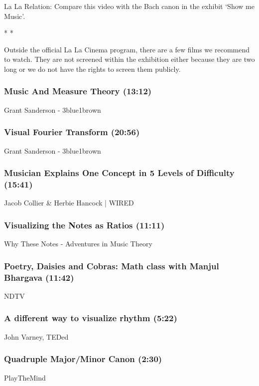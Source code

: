 La La Relation: Compare this video with the Bach canon in the exhibit `Show me Music'.

\begin{center} \large * * * \end{center}
\vspace{1em}

Outside the official La La Cinema program, there are a few films we recommend to watch. They are not screened within the exhibition either because they are two long or we do not have the rights to screen them publicly.

\subsubsection*{Music And Measure Theory (13:12)}
Grant Sanderson - 3blue1brown

\subsubsection*{Visual Fourier Transform (20:56)}
Grant Sanderson - 3blue1brown

\subsubsection*{Musician Explains One Concept in 5 Levels of Difficulty (15:41)}
Jacob Collier \& Herbie Hancock | WIRED

\subsubsection*{Visualizing the Notes as Ratios (11:11)}
Why These Notes - Adventures in Music Theory

\subsubsection*{Poetry, Daisies and Cobras: Math class with Manjul Bhargava (11:42)}
NDTV

\subsubsection*{A different way to visualize rhythm (5:22)}
John Varney, TEDed

\subsubsection*{Quadruple Major/Minor Canon (2:30)}
PlayTheMind

